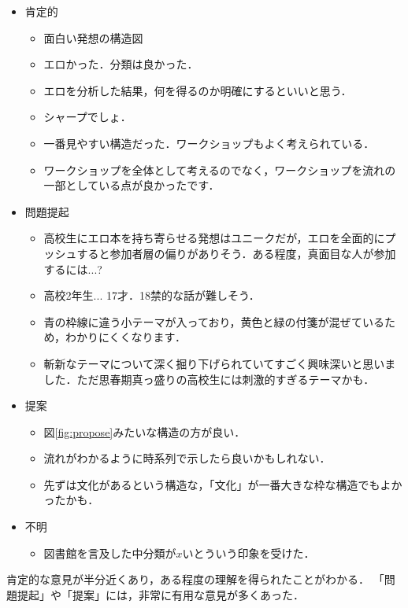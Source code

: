 \documentclass[uplatex,a4paper]{jsarticle}
\begin{document}
\begin{itemize}
    \item 肯定的
    \begin{itemize}
        \item 面白い発想の構造図
        \item エロかった．分類は良かった．
        \item エロを分析した結果，何を得るのか明確にするといいと思う．
        \item シャープでしょ．
        \item 一番見やすい構造だった．ワークショップもよく考えられている．
        \item ワークショップを全体として考えるのでなく，ワークショップを流れの一部としている点が良かったです．
    \end{itemize}
    \item 問題提起
    \begin{itemize}
        \item 高校生にエロ本を持ち寄らせる発想はユニークだが，エロを全面的にプッシュすると参加者層の偏りがありそう．ある程度，真面目な人が参加するには...?
        \item 高校2年生... 17才．18禁的な話が難しそう．
        \item 青の枠線に違う小テーマが入っており，黄色と緑の付箋が混ぜているため，わかりにくくなります．
        \item 斬新なテーマについて深く掘り下げられていてすごく興味深いと思いました．ただ思春期真っ盛りの高校生には刺激的すぎるテーマかも．
    \end{itemize}
    \item 提案
    \begin{itemize}
        \item 図\ref{fig:propose}みたいな構造の方が良い．
        \item 流れがわかるように時系列で示したら良いかもしれない．
        \item 先ずは文化があるという構造な，「文化」が一番大きな枠な構造でもよかったかも．
    \end{itemize}
    \item 不明
    \begin{itemize}
        \item 図書館を言及した中分類が$x$いとういう印象を受けた．
    \end{itemize}
\end{itemize}

肯定的な意見が半分近くあり，ある程度の理解を得られたことがわかる．
「問題提起」や「提案」には，非常に有用な意見が多くあった．
\end{document}
